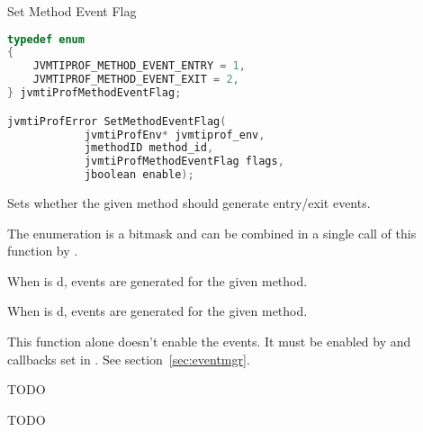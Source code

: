 \begin{apidef}{Set Method Event Flag}
\begin{lstlisting}[language=C]
typedef enum
{
    JVMTIPROF_METHOD_EVENT_ENTRY = 1,
    JVMTIPROF_METHOD_EVENT_EXIT = 2,
} jvmtiProfMethodEventFlag;

jvmtiProfError SetMethodEventFlag(
            jvmtiProfEnv* jvmtiprof_env,
            jmethodID method_id,
            jvmtiProfMethodEventFlag flags,
            jboolean enable);
\end{lstlisting}

\begin{apidesc}
Sets whether the given method should generate entry/exit events.

The  enumeration is a bitmask and can be combined in a single call of this function by .

When  is d,  events are generated for the given method.

When  is d,  events are generated for the given method.

This function alone doesn't enable the events. It must be enabled by  and callbacks set in . See section~\ref{sec:eventmgr}.

\end{apidesc}

\begin{apiphase}
TODO
\end{apiphase}

\begin{apicap}
TODO
\end{apicap}

\begin{apiparam}
\end{apiparam}

\apireturnempty

\begin{apierror}
\end{apierror}
\end{apidef}

